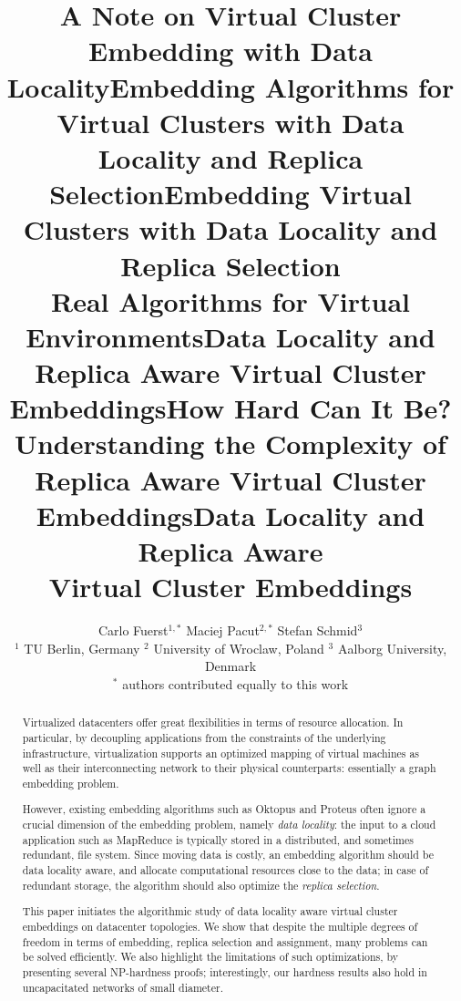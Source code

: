 \documentclass[conference,10pt]{IEEEtran}
\title{A Note on Virtual Cluster Embedding with Data Locality}
\title{Embedding Algorithms for Virtual Clusters with Data Locality and Replica Selection}
\title{Embedding Virtual Clusters with Data Locality and Replica Selection\\{\Large Real Algorithms for Virtual Environments}}
\title{Data Locality and Replica Aware Virtual Cluster Embeddings}
\title{How Hard Can It Be?\\{\Large Understanding the Complexity of  
Replica Aware Virtual Cluster Embeddings}}
\title{Data Locality and Replica Aware\\Virtual Cluster Embeddings}
\author{Carlo Fuerst$^{1,*}$ \quad Maciej Pacut$^{2,*}$ \quad Stefan Schmid$^3$\\
{\small $^1$ TU Berlin, Germany \quad $^2$ University of Wroclaw, Poland \quad $^3$ 
Aalborg University, Denmark} \\ {\small $^*$ authors contributed equally to this work}}
\begin{document}
\maketitle

\sloppy

\begin{abstract}
Virtualized datacenters offer great flexibilities in terms of resource allocation. In particular, by
decoupling applications from the constraints of the underlying infrastructure, virtualization
supports an optimized mapping of virtual machines as well as their interconnecting network
to their
physical counterparts: essentially a graph embedding problem.

However, existing embedding algorithms such as Oktopus and Proteus
often ignore a crucial dimension of the embedding problem, namely \emph{data locality}:
the input to a cloud application such as MapReduce is typically stored in a distributed,
and sometimes redundant, file system. Since moving
data is costly, an embedding algorithm should be data locality aware,
and allocate computational resources close to the data; in case of redundant storage, the algorithm should also optimize the \emph{replica selection}.

This paper initiates the algorithmic study of data locality aware virtual cluster embeddings
on datacenter topologies.
We
show that
despite the multiple degrees of freedom in terms of embedding, replica selection and assignment,
many problems can be
solved efficiently. We also highlight the limitations of such optimizations,
by presenting several NP-hardness proofs; interestingly,
our hardness results also hold in uncapacitated networks of small diameter.
\end{abstract}


%

\end{document}
